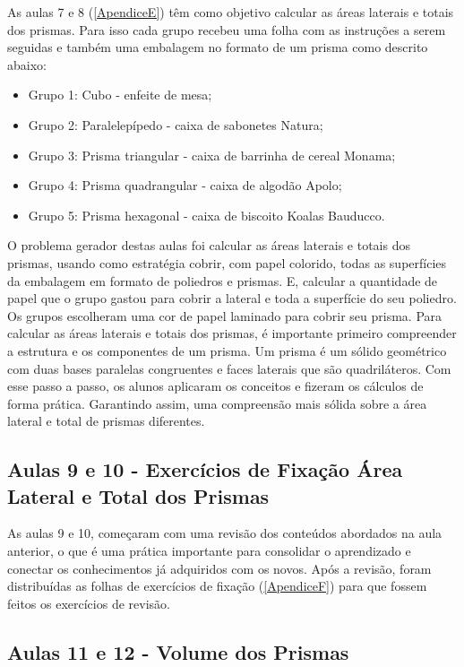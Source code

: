 As aulas 7 e 8 (\autoref{ApendiceE}) têm como objetivo calcular as áreas laterais e totais dos prismas. Para isso cada grupo recebeu uma folha com as instruções a serem seguidas e também uma embalagem no formato de um prisma como descrito abaixo:

\begin{itemize}
    \item Grupo 1: Cubo - enfeite de mesa;
    \item Grupo 2: Paralelepípedo - caixa de sabonetes Natura;
    \item Grupo 3: Prisma triangular - caixa de barrinha de cereal Monama;
    \item Grupo 4: Prisma quadrangular - caixa de algodão Apolo;
    \item Grupo 5: Prisma hexagonal - caixa de biscoito Koalas Bauducco.
\end{itemize}

O problema gerador destas aulas foi calcular as áreas laterais e totais dos prismas, usando como estratégia cobrir, com papel colorido, todas as superfícies da embalagem em formato de poliedros e prismas. E, calcular a quantidade de papel que o grupo gastou para cobrir a lateral e toda a superfície do seu poliedro. Os grupos escolheram uma cor de papel laminado para cobrir seu prisma. Para calcular as áreas laterais e totais dos prismas, é importante primeiro compreender a estrutura e os componentes de um prisma. Um prisma é um sólido geométrico com duas bases paralelas congruentes e faces laterais que são quadriláteros. Com esse passo a passo, os alunos aplicaram os conceitos e fizeram os cálculos de forma prática. Garantindo assim, uma compreensão mais sólida sobre a área lateral e total de prismas diferentes.

\subsection{Aulas 9 e 10 - Exercícios de Fixação Área Lateral e Total dos Prismas}

As aulas 9 e 10, começaram com uma revisão dos conteúdos abordados na aula anterior, o que é uma prática importante para consolidar o aprendizado e conectar os conhecimentos já adquiridos com os novos. Após a revisão, foram distribuídas as folhas de exercícios de fixação (\autoref{ApendiceF}) para que fossem feitos os exercícios de revisão.

\subsection{Aulas 11 e 12 - Volume dos Prismas}

